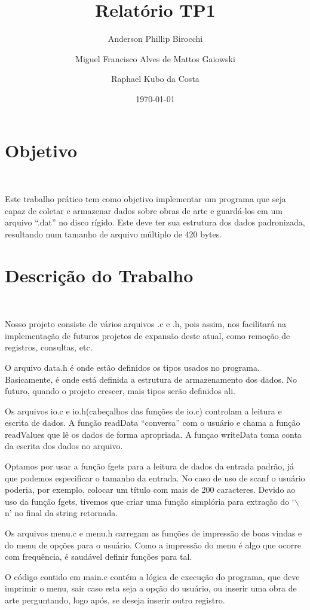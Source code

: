 \documentclass{article}
\title{Relatório TP1}
\author{Anderson Phillip Birocchi \and
  Miguel Francisco Alves de Mattos Gaiowski \and
  Raphael Kubo da Costa}
\date{\today}
\begin{document}
\maketitle

\section*{Objetivo}\

Este trabalho prático tem como objetivo implementar um programa que seja capaz de coletar e armazenar dados sobre obras de arte e guardá-los em um arquivo ``.dat'' no disco rígido. Este deve ter sua estrutura dos dados padronizada, resultando num tamanho de arquivo múltiplo de 420 bytes.

\section*{Descrição do Trabalho}\

Nosso projeto consiste de vários arquivos .c e .h, pois assim, nos facilitará na implementação de futuros projetos de expansão deste atual, como remoção de registros, consultas, etc. 

O arquivo data.h é onde estão definidos os tipos usados no programa. Basicamente, é onde está definida a estrutura de armazenamento dos dados. No futuro, quando o projeto crescer, mais tipos serão definidos ali.

Os arquivos io.c e io.h(cabeçalhos das funções de io.c) controlam a leitura e escrita de dados. A função readData ``conversa'' com o usuário e chama a função readValues que lê os dados de forma apropriada. A funçao writeData toma conta da escrita dos dados no arquivo.

Optamos por usar a função fgets para a leitura de dados da entrada padrão, já que podemos especificar o tamanho da entrada. No caso de uso de scanf o usuário poderia, por exemplo, colocar um título com mais de 200 caracteres. Devido ao uso da função fgets, tivemos que criar uma função simplória para extração do `$\backslash$n' no final da string retornada.

Os arquivos menu.c e menu.h carregam as funções de impressão de boas vindas e do menu de opções para o usuário. Como a impressão do menu é algo que ocorre com frequência, é saudável definir funções para tal.

O código contido em main.c contém a lógica de execução do programa, que deve imprimir o menu, sair caso esta seja a opção do usuário, ou inserir uma obra de arte perguntando, logo após, se deseja inserir outro registro.
\end{document}
